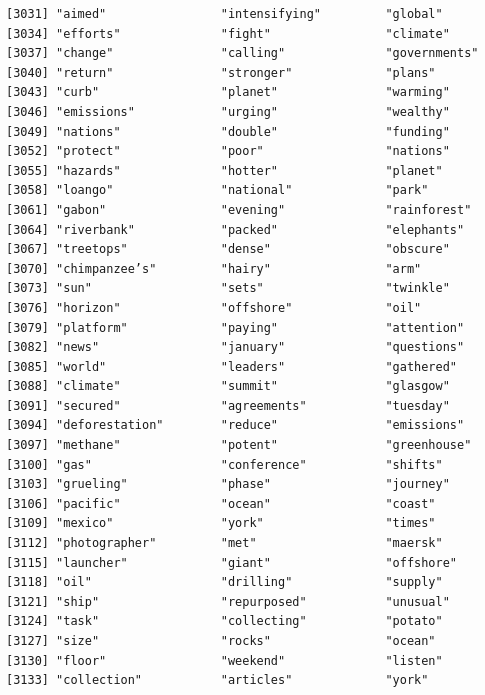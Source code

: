 \documentclass[
  letterpaper,
  DIV=11,
  numbers=noendperiod]{scrartcl}
\begin{document}
\begin{verbatim}
[3031] "aimed"                "intensifying"         "global"              
[3034] "efforts"              "fight"                "climate"             
[3037] "change"               "calling"              "governments"         
[3040] "return"               "stronger"             "plans"               
[3043] "curb"                 "planet"               "warming"             
[3046] "emissions"            "urging"               "wealthy"             
[3049] "nations"              "double"               "funding"             
[3052] "protect"              "poor"                 "nations"             
[3055] "hazards"              "hotter"               "planet"              
[3058] "loango"               "national"             "park"                
[3061] "gabon"                "evening"              "rainforest"          
[3064] "riverbank"            "packed"               "elephants"           
[3067] "treetops"             "dense"                "obscure"             
[3070] "chimpanzee’s"         "hairy"                "arm"                 
[3073] "sun"                  "sets"                 "twinkle"             
[3076] "horizon"              "offshore"             "oil"                 
[3079] "platform"             "paying"               "attention"           
[3082] "news"                 "january"              "questions"           
[3085] "world"                "leaders"              "gathered"            
[3088] "climate"              "summit"               "glasgow"             
[3091] "secured"              "agreements"           "tuesday"             
[3094] "deforestation"        "reduce"               "emissions"           
[3097] "methane"              "potent"               "greenhouse"          
[3100] "gas"                  "conference"           "shifts"              
[3103] "grueling"             "phase"                "journey"             
[3106] "pacific"              "ocean"                "coast"               
[3109] "mexico"               "york"                 "times"               
[3112] "photographer"         "met"                  "maersk"              
[3115] "launcher"             "giant"                "offshore"            
[3118] "oil"                  "drilling"             "supply"              
[3121] "ship"                 "repurposed"           "unusual"             
[3124] "task"                 "collecting"           "potato"              
[3127] "size"                 "rocks"                "ocean"               
[3130] "floor"                "weekend"              "listen"              
[3133] "collection"           "articles"             "york"                

\end{verbatim}
\end{document}
